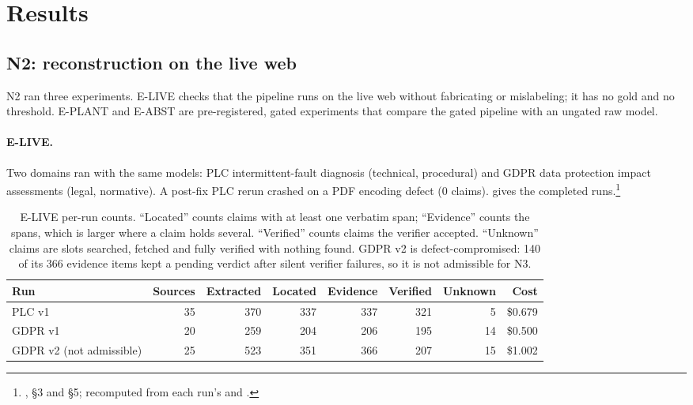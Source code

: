 \section{Results}\label{sec:results}

\subsection{N2: reconstruction on the live web}\label{sec:results-n2}

N2 ran three experiments. E-LIVE checks that the pipeline runs on the live web without fabricating
or mislabeling; it has no gold and no threshold. E-PLANT and E-ABST are pre-registered, gated
experiments that compare the gated pipeline with an ungated raw model.

\paragraph{E-LIVE.} \evobs{} Two domains ran with the same models: PLC intermittent-fault diagnosis
(technical, procedural) and GDPR data protection impact assessments (legal, normative). A post-fix PLC
rerun crashed on a PDF encoding defect (0 claims).  gives the completed
runs.\footnote{, \S3 and \S5; recomputed from each run's
 and .}

\begin{table}[htbp]
  \centering\small
  \caption{E-LIVE per-run counts. \enquote{Located} counts claims with at least one verbatim span;
    \enquote{Evidence} counts the spans, which is larger where a claim holds several. \enquote{Verified}
    counts claims the verifier accepted. \enquote{Unknown} claims are slots searched, fetched and fully
    verified with nothing found. GDPR v2 is defect-compromised: 140 of its 366 evidence items kept a
    pending verdict after silent verifier failures, so it is not admissible for N3.}
  \label{tab:elive}
  \begin{tabularx}{\linewidth}{@{}Xrrrrrrr@{}}
    \toprule
    Run & Sources & Extracted & Located & Evidence & Verified & Unknown & Cost \\
    \midrule
    PLC v1 & 35 & 370 & 337 & 337 & 321 & 5 & \$0.679 \\
    GDPR v1 & 20 & 259 & 204 & 206 & 195 & 14 & \$0.500 \\
    GDPR v2 (not admissible) & 25 & 523 & 351 & 366 & 207 & 15 & \$1.002 \\
    \bottomrule
  \end{tabularx}
\end{table}

